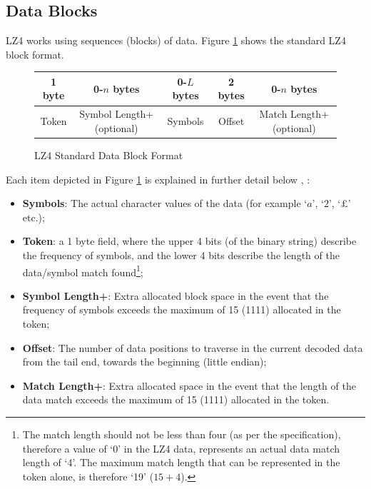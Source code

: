 \documentclass[12pt]{article}
\begin{document}
\subsection{Data Blocks}
LZ4 works using sequences (blocks) of data. Figure \ref{lz4_block} shows the standard LZ4 block format.


\begin{figure}[H]
	\centering
	\begin{tabular}{| c | c | c | c | c |} 
		\hline
		1 byte & 0-$n$ bytes & 0-$L$ bytes & 2 bytes & 0-$n$ bytes\\
		\hline
		Token & Symbol Length+ (optional) & Symbols & Offset & Match Length+ (optional)\\
		\hline
	\end{tabular}
	\caption{LZ4 Standard Data Block Format}
	\label{lz4_block}
\end{figure}

Each item depicted in Figure \ref{lz4_block} is explained in further detail below \citep{how_lz4_works}, \citep{lz4_explained}:

\begin{itemize}
	\item \textbf{Symbols}: The actual character values of the data (for example `$a$', `$2$', `$\pounds$' etc.);
	
	\item \textbf{Token}: a 1 byte field, where the upper 4 bits (of the binary string) describe the frequency of symbols, and the lower 4 bits describe the length of the data/symbol match found\footnote{The match length should not be less than four (as per the specification), therefore a value of `0' in the LZ4 data, represents an actual data match length of `4'. The maximum match length that can be represented in the token alone, is therefore `19' ($15+4$).};
	
	\item \textbf{Symbol Length+}: Extra allocated block space in the event that the frequency of symbols exceeds the maximum of 15 (1111) allocated in the token;
	
	\item \textbf{Offset}: The number of data positions to traverse in the current decoded data from the tail end, towards the beginning (little endian); 
	
	\item \textbf{Match Length+}: Extra allocated space in the event that the length of the data match exceeds the maximum of 15 (1111) allocated in the token.
\end{itemize}
\end{document}
